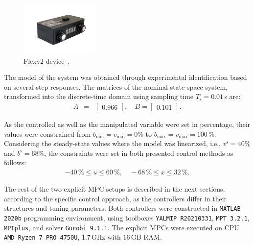 \documentclass[letterpaper, 10 pt, conference]{ieeeconf}
\begin{document}
\begin{figure}
	\begin{center}
		\includegraphics[width=0.35\textwidth]{images/flexy2}
		\caption{Flexy2 device~\cite{flexy2}.}
		\label{fig:flexy2}
	\end{center}
\end{figure}

The model of the system was obtained through experimental identification based on several step responses. The matrices of the nominal state-space system, transformed into the discrete-time domain using sampling time $T_\mathrm{s} = 0.01$\,s are:
\begin{subequations}
	\label{eq:model_A_B} 
	\begin{eqnarray}
		A &=& \begin{bmatrix}
			0.966
		\end{bmatrix}, \quad %
		B = \begin{bmatrix}
			0.101
		\end{bmatrix}. 
	\end{eqnarray}
\end{subequations}

As the controlled as well as the manipulated variable were set in percentage, their values were constrained from $b_{\min} = v_{\min} = 0\%$ to $b_{\max} = v_{\max} = 100\,\%$. Considering the steady-state values where the model was linearized, i.e., $ v^\mathrm{s} = 40\%$ and $ b^\mathrm{s} = 68\%$, the constraints were set in both presented control methods as follows: 
\begin{eqnarray}
\label{eq:const_u_y}
	-40\,\% \le u \le 60\,\%, \quad -68\,\% \le x \le 32\,\%.
\end{eqnarray}

The rest of the two explicit MPC setups is described in the next sections, according to the specific control approach, as the controllers differ in their structures and tuning parameters. Both controllers were constructed in \texttt{MATLAB 2020b} programming environment, using toolboxes \texttt{YALMIP R20210331}, \texttt{MPT 3.2.1}, \texttt{MPTplus},
and solver \texttt{Gurobi 9.1.1}. The explicit MPCs were executed on
CPU \texttt{AMD Ryzen 7 PRO 4750U}, 1.7\,GHz with 16\,GB RAM.
\end{document}
